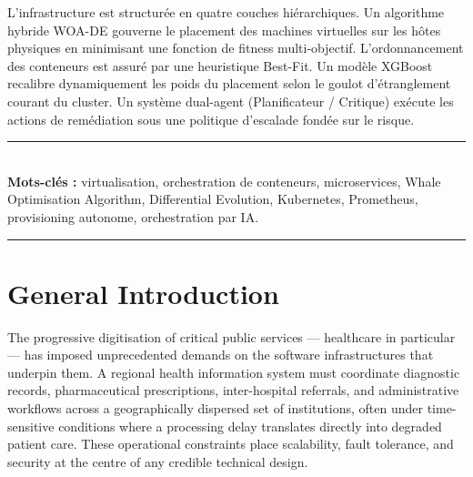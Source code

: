 \documentclass[12pt,a4paper]{report}
\begin{document}
L'infrastructure est structurée en quatre couches hiérarchiques. Un algorithme hybride
WOA-DE gouverne le placement des machines virtuelles sur les hôtes physiques en
minimisant une fonction de fitness multi-objectif. L'ordonnancement des conteneurs est
assuré par une heuristique Best-Fit. Un modèle XGBoost recalibre dynamiquement les
poids du placement selon le goulot d'étranglement courant du cluster. Un système
dual-agent (Planificateur / Critique) exécute les actions de remédiation sous une
politique d'escalade fondée sur le risque.

\vspace{0.8cm}
\noindent\rule{\textwidth}{0.4pt}\\[4pt]
\noindent\textbf{Mots-clés :} virtualisation, orchestration de conteneurs,
microservices, Whale Optimisation Algorithm, Differential Evolution, Kubernetes,
Prometheus, provisioning autonome, orchestration par IA.\\[4pt]
\noindent\rule{\textwidth}{0.4pt}

\tableofcontents
\newpage

\listoffigures
{}
\newpage

\listoftables
{}
\newpage

\setcounter{page}{1}

\chapter*{General Introduction}

The progressive digitisation of critical public services --- healthcare in particular ---
has imposed unprecedented demands on the software infrastructures that underpin them.
A regional health information system must coordinate diagnostic records, pharmaceutical
prescriptions, inter-hospital referrals, and administrative workflows across a
geographically dispersed set of institutions, often under time-sensitive conditions
where a processing delay translates directly into degraded patient care. These
operational constraints place scalability, fault tolerance, and security at the centre
of any credible technical design.
\end{document}
